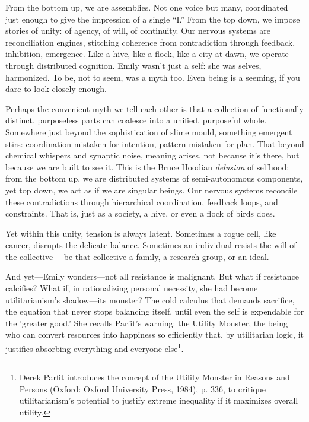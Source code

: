\smallskip

From the bottom up, we are assemblies. Not one voice but many, coordinated just enough to give the impression of a single “I.” From the top down, we impose stories of unity: of agency, of will, of continuity. Our nervous systems are reconciliation engines, stitching coherence from contradiction through feedback, inhibition, emergence. Like a hive, like a flock, like a city at dawn, we operate through distributed cognition. Emily wasn’t just a self: she was selves, harmonized. To be, not to seem, was a myth too. Even being is a seeming, if you dare to look closely enough.

\smallskip

Perhaps the convenient myth we tell each other is that a collection of functionally distinct, purposeless parts can coalesce into a unified, purposeful whole. Somewhere just beyond the sophistication of slime mould, something emergent stirs: coordination mistaken for intention, pattern mistaken for plan. That beyond chemical whispers and synaptic noise, meaning arises, not because it’s there, but because we are built to see it. This is the Bruce Hoodian \textit{delusion} of selfhood: from the bottom up, we are distributed systems of semi-autonomous components, yet top down, we act as if we are singular beings. Our nervous systems reconcile these contradictions through hierarchical coordination, feedback loops, and constraints. That is, just as a society, a hive, or even a flock of birds does.

\smallskip

Yet within this unity, tension is always latent. Sometimes a rogue cell, like cancer, disrupts the delicate balance. Sometimes an individual resists the will of the collective —be that collective a family, a research group, or an ideal.

\smallskip

And yet—Emily wonders—not all resistance is malignant. But what if resistance calcifies? What if, in rationalizing personal necessity, she had become utilitarianism’s shadow—its monster? The cold calculus that demands sacrifice, the equation that never stops balancing itself, until even the self is expendable for the 'greater good.' She recalls Parfit’s warning: the Utility Monster, the being who can convert resources into happiness so efficiently that, by utilitarian logic, it justifies absorbing everything and everyone else\footnote{Derek Parfit introduces the concept of the Utility Monster in Reasons and Persons (Oxford: Oxford University Press, 1984), p. 336, to critique utilitarianism's potential to justify extreme inequality if it maximizes overall utility.}.

